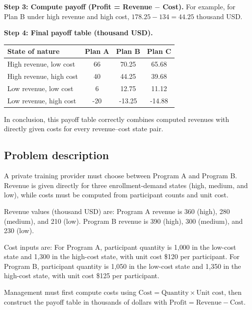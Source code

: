 \begin{ExamProblems}
		\textbf{Step 3: Compute payoff (Profit = Revenue $-$ Cost).}
		For example, for Plan B under high revenue and high cost,
		\(178.25-134=44.25\) thousand USD.
		
		\textbf{Step 4: Final payoff table (thousand USD).}
		\begin{center}
			\begin{tabular}{l c c c}
				\toprule
				State of nature & Plan A & Plan B & Plan C \\
				\midrule
				High revenue, low cost & 66 & 70.25 & 65.68 \\
				High revenue, high cost & 40 & 44.25 & 39.68 \\
				Low revenue, low cost & 6 & 12.75 & 11.12 \\
				Low revenue, high cost & -20 & -13.25 & -14.88 \\
				\bottomrule
			\end{tabular}
		\end{center}
		
		In conclusion, this payoff table correctly combines computed revenues with directly given costs for every revenue--cost state pair.
		
		\item
		\subsection*{Problem description}
		A private training provider must choose between Program A and Program B.
		Revenue is given directly for three enrollment-demand states (high, medium, and low), while costs must be computed from participant counts and unit cost.
		
		Revenue values (thousand USD) are:
		Program A revenue is 360 (high), 280 (medium), and 210 (low).
		Program B revenue is 390 (high), 300 (medium), and 230 (low).
		
		Cost inputs are:
		For Program A, participant quantity is 1{,}000 in the low-cost state and 1{,}300 in the high-cost state, with unit cost \$120 per participant.
		For Program B, participant quantity is 1{,}050 in the low-cost state and 1{,}350 in the high-cost state, with unit cost \$125 per participant.
		
		Management must first compute costs using
		\(\text{Cost}=\text{Quantity}\times\text{Unit cost}\), then construct the payoff table in thousands of dollars with
		\(\text{Profit}=\text{Revenue}-\text{Cost}\).

\end{ExamProblems}
